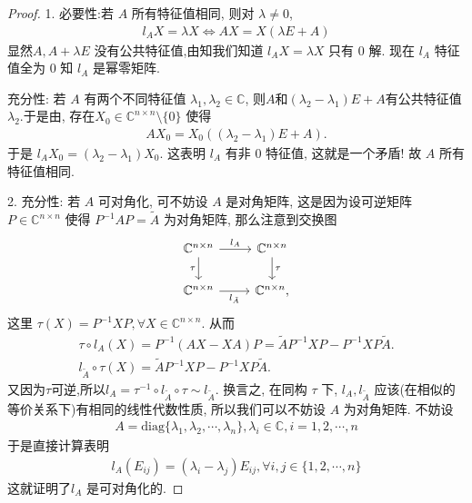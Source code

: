\documentclass[../../main.tex]{subfiles}
\begin{document}
\begin{proof}
1. {\heiti 必要性:}若 $A$ 所有特征值相同, 则对 $\lambda \neq 0$,
\begin{align*}
l_A X = \lambda X \Leftrightarrow AX = X(\lambda E + A)
\end{align*}
显然$A, A + \lambda E$ 没有公共特征值,由知我们知道 $l_A X = \lambda X$ 只有 $0$ 解. 现在 $l_A$ 特征值全为 $0$ 知 $l_A$ 是幂零矩阵.

{\heiti 充分性:} 若 $A$ 有两个不同特征值 $\lambda_1, \lambda_2 \in \mathbb{C}$, 则$A$和$(\lambda_2-\lambda_1)E+A$有公共特征值$\lambda_2$.于是由, 存在$X_0 \in \mathbb{C}^{n \times n} \setminus \{0\}$ 使得
\begin{align*}
A X_0 = X_0((\lambda_2 - \lambda_1)E + A).
\end{align*}
于是 $l_A X_0 = (\lambda_2 - \lambda_1) X_0$. 这表明 $l_A$ 有非 $0$ 特征值, 这就是一个矛盾! 故 $A$ 所有特征值相同.

2. {\heiti 充分性:} 若 $A$ 可对角化, 可不妨设 $A$ 是对角矩阵, 这是因为设可逆矩阵 $P \in \mathbb{C}^{n \times n}$ 使得 $P^{-1} A P = \tilde{A}$ 为对角矩阵, 那么注意到交换图
\[
\begin{tikzcd}
\mathbb{C}^{n\times n} \arrow[d, "\tau"'] \arrow[r, "l_A"] & \mathbb{C}^{n\times n} \arrow[d, "\tau"] \\
\mathbb{C}^{n\times n} \arrow[r, "l_{\tilde{A}}"']                   & \mathbb{C}^{n\times n},                  
\end{tikzcd}
\]
这里 $\tau(X) = P^{-1} X P, \forall X \in \mathbb{C}^{n \times n}$. 从而
\begin{gather*}
\tau \circ l_A\left( X \right) =P^{-1}\left( AX-XA \right) P=\widetilde{A}P^{-1}XP-P^{-1}XP\widetilde{A}.
\\
l_{\widetilde{A}}\circ \tau \left( X \right) =\widetilde{A}P^{-1}XP-P^{-1}XP\widetilde{A}.
\end{gather*}
又因为$\tau$可逆,所以$l_A=\tau ^{-1} \circ l_{\tilde{A}}\circ \tau \sim l_{\tilde{A}}.$
换言之, 在同构 $\tau$ 下, $l_A, l_{\tilde{A}}$ 应该(在相似的等价关系下)有相同的线性代数性质, 所以我们可以不妨设 $A$ 为对角矩阵.
不妨设
\begin{align*}
A = \mathrm{diag}\{\lambda_1, \lambda_2, \cdots, \lambda_n\}, \lambda_i \in \mathbb{C}, i = 1, 2, \cdots, n 
\end{align*}
于是直接计算表明
\begin{align*}
l_A(E_{ij}) = (\lambda_i - \lambda_j) E_{ij}, \forall i, j \in \{1, 2, \cdots, n\}
\end{align*}
这就证明了$l_A$ 是可对角化的.


\end{proof}
\end{document}
